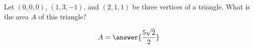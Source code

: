 \documentclass{ximera}
\author{Gregory Hartman \and Matthew Carr}
\begin{document}
\begin{exercise}



Let $(0,0,0)$, $(1,3,-1)$, and $(2,1,1)$ be three vertices of a triangle. What is the area $A$ of this triangle?
\begin{prompt}
\[
A=\answer{\frac{5\sqrt{2}}{2}}
\]
\end{prompt}


\end{exercise}
\end{document}
